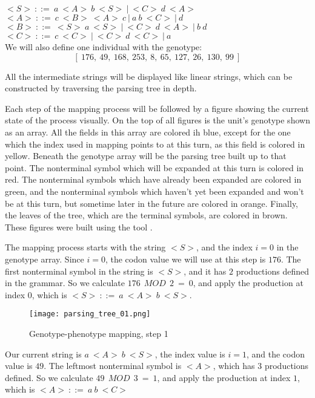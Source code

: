 \noindent
$ {<}S{>}\:::=\:a\:{<}A{>}\:b\:{<}S{>}\:|\:{<}C{>}\:d\:{<}A{>}\:$\\
$ {<}A{>}\:::=\:c\:{<}B{>}\:{<}A{>}\:c\:|\:a\:b\:{<}C{>}\:|\:d $\\
$ {<}B{>}\:::=\:{<}S{>}\:a\:{<}S{>}\:|\:{<}C{>}\:d\:{<}A{>}\:|\:b\:d $\\
$ {<}C{>}\:::=\:c\:{<}C{>}\:|\:{<}C{>}\:d\:{<}C{>}\:|\:a $\\

We will also define one individual with the genotype: 
$$ [\:176,\:49,\:168,\:253,\:8,\:65,\:127,\:26,\:130,\:99\:] $$

All the intermediate strings will be displayed like linear strings, which can be constructed by traversing the parsing tree in depth.

Each step of the mapping process will be followed by a figure showing the current state of the process visually. On the top of all figures is the unit's genotype shown as an array. All the fields in this array are colored ih blue, except for the one which the index used in mapping points to at this turn, as this field is colored in yellow. Beneath the genotype array will be the parsing tree built up to that point. The nonterminal symbol which will be expanded at this turn is colored in red. The nonterminal symbols which have already been expanded are colored in green, and the nonterminal symbols which haven't yet been expanded and won't be at this turn, but sometime later in the future are colored in orange. Finally, the leaves of the tree, which are the terminal symbols, are colored in brown. These figures were built using the tool \citep{diagrams}.

The mapping process starts with the string ${<}S{>}$, and the index $i = 0$ in the genotype array. Since $i = 0$, the codon value we will use at this step is $176$. The first nonterminal symbol in the string is ${<}S{>}$, and it has $2$ productions defined in the grammar. So we calculate $176\:\:MOD\:\:2\:=\:0$, and apply the production at index $0$, which is ${<}S{>}\:::=\:a\:{<}A{>}\:b\:{<}S{>}$.

\begin{figure}[H]
	\centering
	\texttt{[image: parsing\_tree\_01.png]}
	\caption{Genotype-phenotype mapping, step 1}
\end{figure}

Our current string is $a\:{<}A{>}\:b\:{<}S{>}$, the index value is $i = 1$, and the codon value is $49$. The leftmost nonterminal symbol is ${<}A{>}$, which has $3$ productions defined. So we calculate $49\:\:MOD\:\:3\:=\:1$, and apply the production at index $1$, which is ${<}A{>}\:::=\:a\:b\:{<}C{>}$

